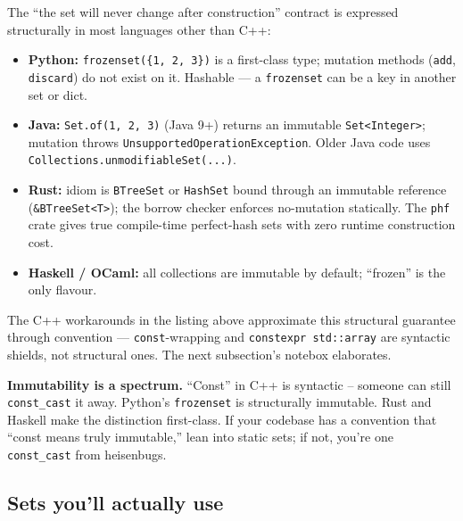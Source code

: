 \documentclass[11pt]{article}
\begin{document}
\begin{notebox}
The ``the set will never change after construction'' contract is
expressed structurally in most languages other than C++:
\begin{itemize}[leftmargin=*]
    \item \textbf{Python:} \texttt{frozenset(\{1, 2, 3\})} is a
          first-class type; mutation methods (\texttt{add},
          \texttt{discard}) do not exist on it. Hashable ---
          a \texttt{frozenset} can be a key in another set or
          dict.
    \item \textbf{Java:} \texttt{Set.of(1, 2, 3)} (Java 9+)
          returns an immutable \texttt{Set<Integer>}; mutation
          throws \texttt{UnsupportedOperationException}.
          Older Java code uses
          \texttt{Collections.unmodifiableSet(...)}.
    \item \textbf{Rust:} idiom is \texttt{BTreeSet} or
          \texttt{HashSet} bound through an immutable reference
          (\texttt{\&BTreeSet<T>}); the borrow checker enforces
          no-mutation statically. The \texttt{phf} crate gives
          true compile-time perfect-hash sets with zero runtime
          construction cost.
    \item \textbf{Haskell / OCaml:} all collections are immutable
          by default; ``frozen'' is the only flavour.
\end{itemize}
The C++ workarounds in the listing above approximate this
structural guarantee through convention --- \texttt{const}-wrapping
and \texttt{constexpr std::array} are syntactic shields, not
structural ones. The next subsection's notebox elaborates.
\end{notebox}

\begin{notebox}
\textbf{Immutability is a spectrum.} ``Const'' in C++ is syntactic -- someone can still \texttt{const\_cast} it away. Python's \texttt{frozenset} is structurally immutable. Rust and Haskell make the distinction first-class. If your codebase has a convention that ``const means truly immutable,'' lean into static sets; if not, you're one \texttt{const\_cast} from heisenbugs.
\end{notebox}

\subsection*{Sets you'll actually use}
\end{document}
